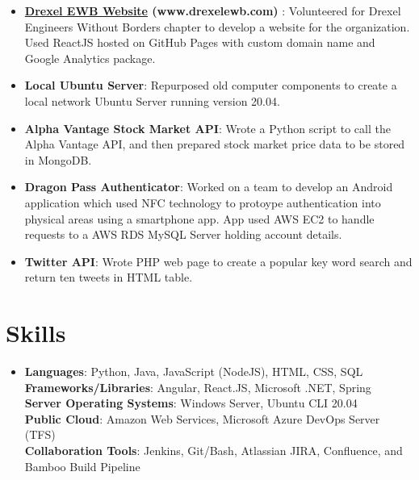 \documentclass[letterpaper,11pt]{article}
\newcommand{\resumeItemSmall}[2]{
        \item[]
        \small{
            \textbf{#1}{: #2 \vspace{-2pt}}
        }
    }
\newcommand{\resumeSubItemSmall}[2]{\resumeItemSmall{#1}{#2}\vspace{-4pt}}
\newcommand{\resumeSubHeadingListStart}{\begin{itemize}[leftmargin=*]}
\newcommand{\resumeSubHeadingListEnd}{\end{itemize}}
\begin{document}
            \resumeSubHeadingListStart
                \resumeSubItemSmall{\href{www.drexelewb.com}{Drexel EWB Website} (www.drexelewb.com) }{Volunteered for Drexel Engineers Without Borders chapter to develop a website for the organization. Used ReactJS hosted on GitHub Pages with custom domain name and Google Analytics package.}
                \resumeSubItemSmall{Local Ubuntu Server}{Repurposed old computer components to create a local network Ubuntu Server running version 20.04.}
                \resumeSubItemSmall{Alpha Vantage Stock Market API}{Wrote a Python script to call the Alpha Vantage API, and then prepared stock market price data to be stored in MongoDB.}
                \resumeSubItemSmall{Dragon Pass Authenticator}{Worked on a team to develop an Android application which used NFC technology to protoype authentication into physical areas using a smartphone app. App used AWS EC2 to handle requests to a AWS RDS MySQL Server holding account details.}
                \resumeSubItemSmall{Twitter API}{Wrote PHP web page to create a popular key word search and return ten tweets in HTML table.}
            \resumeSubHeadingListEnd

        \section{Skills}
            \resumeSubHeadingListStart
            \item[]{
                \textbf{Languages}{: Python, Java, JavaScript (NodeJS), HTML, CSS, SQL}
                \hfill \\
                \textbf{Frameworks/Libraries}{: Angular, React.JS, Microsoft .NET, Spring} \\
                \textbf{Server Operating Systems}{: Windows Server, Ubuntu CLI 20.04} \\
                \textbf{Public Cloud}{: Amazon Web Services, Microsoft Azure DevOps Server (TFS)} \\
                \textbf{Collaboration Tools}{: Jenkins, Git/Bash, Atlassian JIRA, Confluence, and Bamboo Build Pipeline} \\
            }
            \resumeSubHeadingListEnd
    
\end{document}
